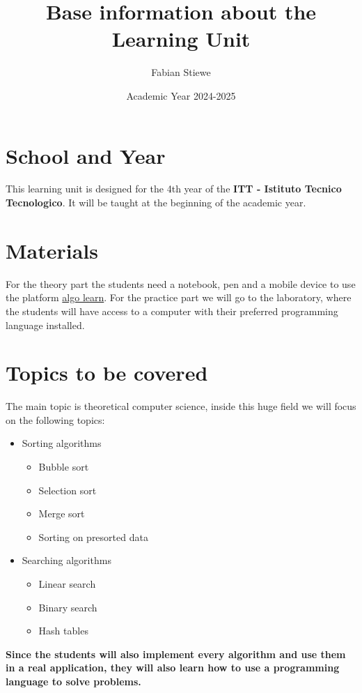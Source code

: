 \documentclass[10pt, oneside]{article}
\title{Base information about the Learning Unit}
\author{Fabian Stiewe}
\date{Academic Year 2024-2025}
\theoremstyle{remark}
\begin{document}
\maketitle
\tableofcontents

\section{School and Year}
This learning unit is designed for the 4th year of the \textbf{ITT - Istituto Tecnico Tecnologico}. It will be taught at the beginning of the academic year.

\section{Materials}
For the theory part the students need a notebook, pen and a mobile device to use the platform \href{https://tcs.uni-frankfurt.de/algo-learn-testing/refs_heads_feat-bubbleSort/en}{algo learn}. For the practice part we will go to the laboratory, where the students will have access to a computer with their preferred programming language installed.

\section{Topics to be covered}
The main topic is theoretical computer science, inside this huge field we will focus on the following topics:
\begin{itemize}
  \item Sorting algorithms
  \begin{itemize}
    \item Bubble sort
    \item Selection sort
    \item Merge sort
    \item Sorting on presorted data
  \end{itemize}    
  \item Searching algorithms
  \begin{itemize}
    \item Linear search
    \item Binary search
    \item Hash tables
  \end{itemize}
\end{itemize}
\textbf{Since the students will also implement every algorithm and use them in a real application, they will also learn how to use a programming language to solve problems.}
\end{document}
